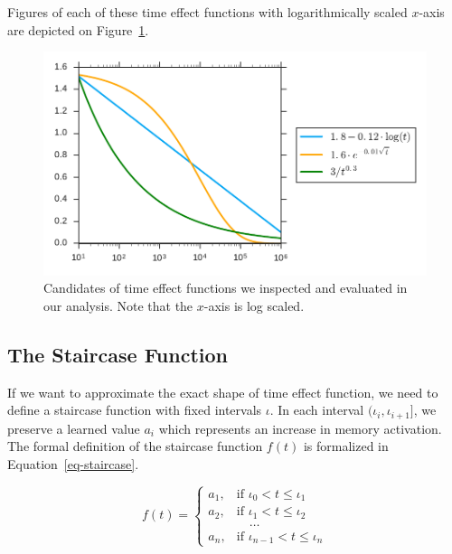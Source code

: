 Figures of each of these time effect functions with logarithmically scaled $x$-axis are depicted on Figure~\ref{fig-time-effect-functions}.

\begin{figure}[htbp]
  \centering
  \includegraphics[width=\textwidth]{img/time-effect-functions}
  \caption{Candidates of time effect functions we inspected and evaluated in our analysis. Note that the $x$-axis is log scaled.}
  \label{fig-time-effect-functions}
\end{figure}

\subsection{The Staircase Function}
\label{staircase-function}

If we want to approximate the exact shape of time effect function, we need to define a staircase function with fixed intervals $\iota$. In each interval $(\iota_i, \iota_{i+1}]$, we preserve a learned value $a_i$ which represents an increase in memory activation. The formal definition of the staircase function $f(t)$ is formalized in Equation~\ref{eq-staircase}.

\begin{equation} \label{eq-staircase}
  f(t) = \begin{cases}
            a_1, & \text{if } \iota_0 < t \leq \iota_1 \\
            a_2, & \text{if } \iota_1 < t \leq \iota_2 \\
                 & \hspace{1em} \dots \\
            a_n, & \text{if } \iota_{n-1} < t \leq \iota_n
         \end{cases}
\end{equation}

